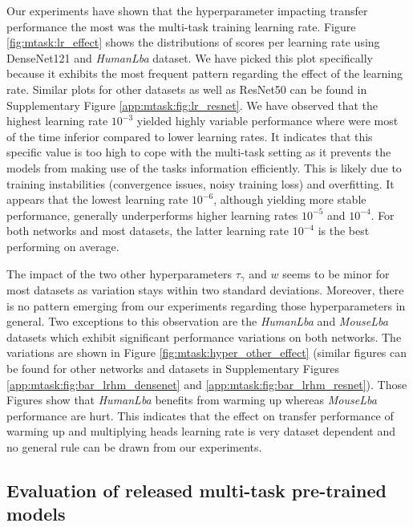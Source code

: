 Our experiments have shown that the hyperparameter impacting transfer performance the most was the multi-task training learning rate. Figure \ref{fig:mtask:lr_effect} shows the distributions of scores per learning rate using DenseNet121 and \textit{HumanLba} dataset. We have picked this plot specifically because it exhibits the most frequent pattern regarding the effect of the learning rate. Similar plots for other datasets as well as ResNet50 can be found in Supplementary Figure \ref{app:mtask:fig:lr_resnet}. We have observed that the highest learning rate $10^{-3}$ yielded highly variable performance where were most of the time inferior compared to lower learning rates. It indicates that this specific value is too high to cope with the multi-task setting as it prevents the models from making use of the tasks information efficiently. This is likely due to training instabilities (convergence issues, noisy training loss) and overfitting. It appears that the lowest learning rate $10^{-6}$, although yielding more stable performance, generally underperforms higher learning rates $10^{-5}$ and $10^{-4}$. For both networks and most datasets, the latter learning rate $10^{-4}$ is the best performing on average.

The impact of the two other hyperparameters $\tau_\gamma$ and $w$ seems to be minor for most datasets as variation stays within two standard deviations. Moreover, there is no pattern emerging from our experiments regarding those hyperparameters in general. Two exceptions to this observation are the \textit{HumanLba} and \textit{MouseLba} datasets which exhibit significant performance variations on both networks. The variations are shown in Figure \ref{fig:mtask:hyper_other_effect} (similar figures can be found for other networks and datasets in Supplementary Figures \ref{app:mtask:fig:bar_lrhm_densenet} and \ref{app:mtask:fig:bar_lrhm_resnet}). Those Figures show that \textit{HumanLba} benefits from warming up whereas \textit{MouseLba} performance are hurt. This indicates that the effect on transfer performance of warming up and multiplying heads learning rate is very dataset dependent and no general rule can be drawn from our experiments.

\subsection{Evaluation of released multi-task pre-trained models}
\label{ssec:mtask:breakhis_eval}

